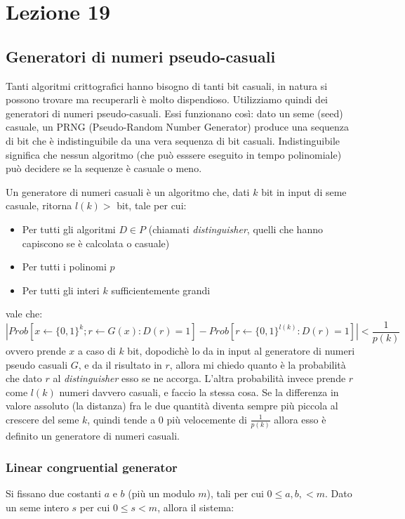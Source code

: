 \section*{Lezione 19}

\subsection*{Generatori di numeri pseudo-casuali}
Tanti algoritmi crittografici hanno bisogno di tanti bit casuali, in natura si possono trovare ma recuperarli è molto dispendioso. Utilizziamo quindi dei generatori di numeri pseudo-casuali. Essi funzionano così: dato un seme (seed) casuale, un PRNG (Pseudo-Random Number Generator) produce una sequenza di bit che è indistinguibile da una vera sequenza di bit casuali. Indistinguibile significa che nessun algoritmo (che può esssere eseguito in tempo polinomiale) può decidere se la sequenze è casuale o meno.

Un generatore di numeri casuali è un algoritmo che, dati $k$ bit in input di seme casuale, ritorna $l(k) > $ bit, tale per cui:
\begin{itemize}
	\item Per tutti gli algoritmi $D \in P$ (chiamati \textit{distinguisher}, quelli che hanno capiscono se è calcolata o casuale)
	\item Per tutti i polinomi $p$
	\item Per tutti gli interi $k$ sufficientemente grandi
\end{itemize}
vale che:
\begin{equation*}
|Prob[x \leftarrow \{0, 1\}^k; r \leftarrow G(x):D(r) = 1]-Prob[r \leftarrow\{0,1\}^{l(k)} : D(r) = 1] | < \frac1{p(k)}
\end{equation*}
ovvero prende $x$ a caso di $k$ bit, dopodichè lo da in input al generatore di numeri pseudo casuali $G$, e da il risultato in $r$, allora mi chiedo quanto è la probabilità che dato $r$ al \textit{distinguisher} esso se ne accorga. L'altra probabilità invece prende $r$ come $l(k)$ numeri davvero casuali, e faccio la stessa cosa. Se la differenza in valore assoluto (la distanza) fra le due quantità diventa sempre più piccola al crescere del seme $k$, quindi tende a 0 più velocemente di $\frac1{p(k)}$ allora esso è definito un generatore di numeri casuali.

\subsubsection*{Linear congruential generator}
Si fissano due costanti $a$ e $b$ (più un modulo $m$), tali per cui $0 \leq a, b, < m$.
Dato un seme intero $s$ per cui $0 \leq s < m$, allora il sistema:

